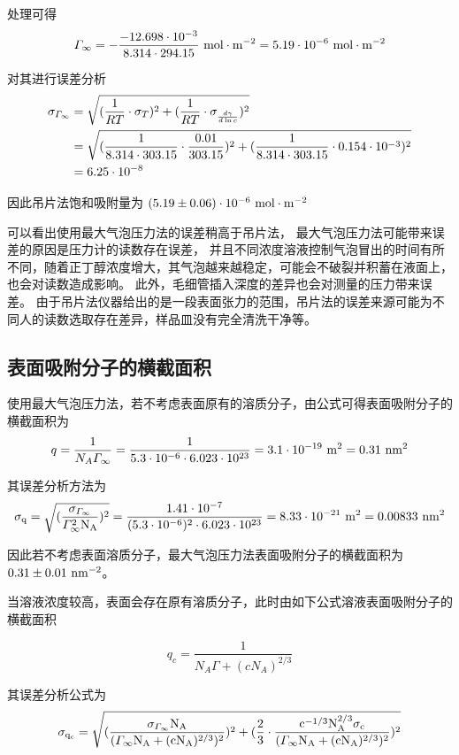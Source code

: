 \documentclass[cn,hazy,pku,12pt,normal,math=newtx,cite=super]{elegantnote}
\begin{document}
处理可得
$$
    \varGamma_\infty = - \frac{ -  12.698  \cdot 10^{-3} }{8.314 \cdot 294.15 } {\rm\ mol \cdot m^{-2}} = 5.19 \cdot 10^{-6} {\rm\ mol \cdot m^{-2}}
$$

对其进行误差分析
\begin{equation*}
    \begin{split}
    \rm \sigma_{\varGamma_\infty} 
    &= \sqrt{(\frac{1}{RT} \cdot \sigma_T)^2 + (\frac{1}{RT} \cdot \sigma_
    {\frac{d \gamma}{d \ln c}})^2} \\
    &= \sqrt{(\frac{1}{8.314 \cdot 303.15} \cdot \frac{0.01}{303.15})^2 + (\frac{1}{8.314 \cdot 303.15} \cdot 0.154 \cdot 10^{-3})^2}
    \\
    &= 6.25 \cdot 10^{-8}
    \end{split}
\end{equation*}

因此吊片法饱和吸附量为 $(5.19 \pm 0.06) \cdot 10^{-6} {\rm\ mol \cdot m^{-2}}$

可以看出使用最大气泡压力法的误差稍高于吊片法，
最大气泡压力法可能带来误差的原因是压力计的读数存在误差，
并且不同浓度溶液控制气泡冒出的时间有所不同，随着正丁醇浓度增大，其气泡越来越稳定，可能会不破裂并积蓄在液面上，也会对读数造成影响。
此外，毛细管插入深度的差异也会对测量的压力带来误差。
由于吊片法仪器给出的是一段表面张力的范围，吊片法的误差来源可能为不同人的读数选取存在差异，样品皿没有完全清洗干净等。


\subsection{表面吸附分子的横截面积}

使用最大气泡压力法，若不考虑表面原有的溶质分子，由公式可得表面吸附分子的横截面积为
$$
   q = \frac{1}{N_A \varGamma_\infty} = \frac{1}{5.3 \cdot 10^{-6} \cdot  6.023 \cdot 10^{23}} = 3.1 \cdot 10^{-19}{\rm\ m^2} = 0.31{\rm\ nm^2}
$$

其误差分析方法为
$$
\rm \sigma_{q} = \sqrt{(\frac{\sigma_{\varGamma_\infty}}{\varGamma_\infty^2 N_A} )^2} = \frac{1.41 \cdot 10^{-7} }{(5.3 \cdot 10^{-6})^2 \cdot  6.023 \cdot 10^{23}} = 8.33 \cdot 10^{-21}\ m^2 = 0.00833\ nm^2
$$

因此若不考虑表面溶质分子，最大气泡压力法表面吸附分子的横截面积为 $0.31 \pm 0.01 {\rm\ nm^{-2}}$。

当溶液浓度较高，表面会存在原有溶质分子，此时由如下公式溶液表面吸附分子的横截面积

$$
   q_c = \frac{1}{N_A \varGamma + (cN_A)^{2/3}} 
$$

其误差分析公式为
$$
\rm \sigma_{q_c} = \sqrt{(\frac{\sigma_{\varGamma_\infty} N_A}{(\varGamma_\infty N_A + (cN_A)^{2/3})^2} )^2+(\frac{2}{3} \cdot \frac{c^{-1/3}N_A^{2/3}\sigma_c}{(\varGamma_\infty N_A+(cN_A)^{2/3})^2})^2} 
$$
\end{document}

